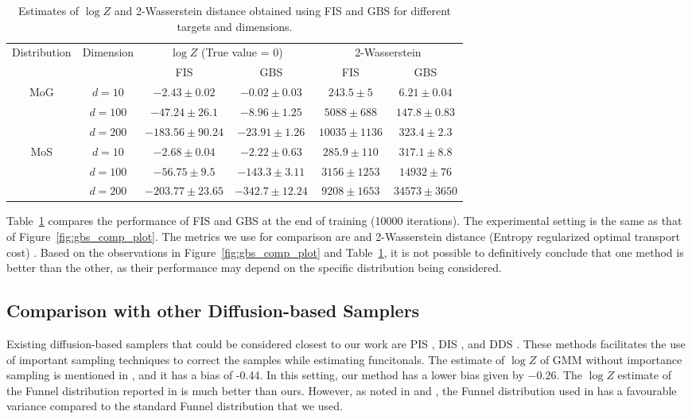 \begin{table}[!htb]
  \caption{Estimates of $\log Z$ and 2-Wasserstein distance obtained using FIS and GBS for different targets and dimensions.}
  \label{tab:gbs_com_was}
  \centering
  \begin{tabular}{cccccc}
    \toprule
     Distribution & Dimension & \multicolumn{2}{c}{$\log Z$ (True value = 0)} & \multicolumn{2}{c}{2-Wasserstein} \\
     \cmidrule(lr){3-4} \cmidrule(lr){5-6}
     & & FIS & GBS & FIS & GBS \\
     \midrule
    \multirow{3}{*}{MoG} & $d=10$ & $-2.43 \pm 0.02$ & $-0.02 \pm 0.03$ & $243.5 \pm 5$ & $6.21 \pm 0.04$ \\
     & $d=100$ & $-47.24 \pm 26.1$ & $-8.96 \pm 1.25$ & $5088 \pm 688$ & $147.8 \pm 0.83$ \\
     & $d=200$ & $-183.56 \pm 90.24$ & $-23.91 \pm 1.26$ & $10035 \pm 1136$ & $323.4 \pm 2.3$ \\
     \midrule
    \multirow{3}{*}{MoS} & $d=10$ & $-2.68 \pm 0.04$ & $-2.22 \pm 0.63$ & $285.9 \pm 110$ & $317.1 \pm 8.8$ \\
     & $d=100$ & $-56.75 \pm 9.5$ & $-143.3 \pm 3.11$ & $3156 \pm 1253$ & $14932 \pm 76$ \\
     & $d=200$ & $-203.77 \pm 23.65$ & $-342.7 \pm 12.24$ & $9208 \pm 1653$ & $34573 \pm 3650$ \\
    \bottomrule
  \end{tabular}
\end{table}

Table~\ref{tab:gbs_com_was} compares the performance of FIS and GBS at the end of training (10000 iterations). The experimental setting is the same as that of Figure~\ref{fig:gbs_comp_plot}. The metrics we use for comparison are 
 and 2-Wasserstein distance (Entropy regularized optimal transport cost) \cite{blessing_beyond_2024}. Based on the observations in Figure~\ref{fig:gbs_comp_plot} and Table~\ref{tab:gbs_com_was}, it is not possible to definitively conclude that one method is better than the other, as their performance may depend on the specific distribution being considered.
 \subsection{Comparison with other Diffusion-based Samplers}
 Existing diffusion-based samplers that could be considered closest to our work are PIS \cite{zhang_path_2022}, DIS \cite{berner_optimal_2023}, and DDS \cite{vargas_denoising_2022}. These methods facilitates the use of important sampling techniques to correct the samples while estimating funcitonals. The estimate of $\log Z$ of GMM without importance sampling is mentioned in \cite{zhang_path_2022}, and it has a bias of -0.44. In this setting, our method has a lower bias given by $-0.26$. The $\log Z$ estimate of the Funnel distribution reported in \cite{zhang_path_2022} is much better than ours. However, as noted in \cite{berner_optimal_2023} and \cite{vargas_denoising_2022}, the Funnel distribution used in \cite{zhang_path_2022} has a favourable variance compared to the standard Funnel distribution that we used.

